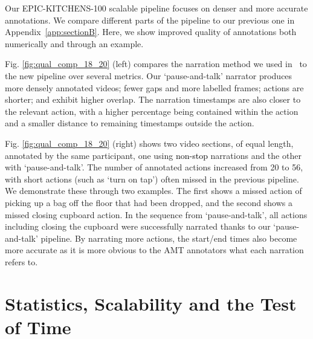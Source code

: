 \documentclass[twocolumn]{svjour3}          \smartqed
\newcommand{\chParagraph}[1]{\noindent {\textbf{#1.}} \hspace{6pt}}
\newcommand{\edits}[1]{\textcolor{black}{#1}}
\newcommand {\newDataset} {EPIC-KITCHENS-100}
\newcommand{\annStyle} {`pause-and-talk'{}}
\begin{document}
\chParagraph{Quality Improvements}
Our \newDataset{} scalable pipeline focuses on denser and more accurate annotations. We compare different parts of the pipeline to our previous one in Appendix~\ref{app:sectionB}.
Here, we show improved quality of annotations both numerically and through an example.

Fig. \ref{fig:qual_comp_18_20} (left) compares the narration method we used in~\cite{Damen2018EPICKITCHENS} to the new pipeline over several metrics. Our \annStyle{} narrator produces more densely annotated videos; fewer gaps and more labelled frames; actions are shorter; and exhibit higher overlap. 
The narration timestamps are also closer to the relevant action, with a higher percentage being contained within the action and a smaller distance to remaining timestamps outside the action.

Fig. \ref{fig:qual_comp_18_20} (right) shows two video sections, of equal length, annotated by the same participant, one using \edits{non-stop} narrations and the other with \annStyle.
The number of annotated actions increased from 20 to 56, with short actions (such as `turn on tap') often missed in the previous pipeline.
We demonstrate these through two examples.
The first shows a missed action of  picking up a bag off the floor that had been dropped, and the second shows a missed closing cupboard action.
In the sequence from \annStyle{}, all actions including closing the cupboard were successfully narrated thanks to our \annStyle{} pipeline. By narrating more actions, the start/end times also become more accurate as it is more obvious to the AMT annotators what each narration refers to.


\section{Statistics, Scalability and the Test of Time}
\label{sec:statistics}
\end{document}
